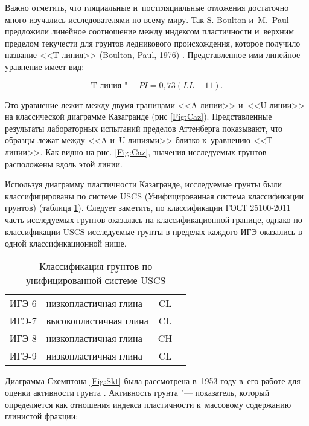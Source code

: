 Важно отметить, что гляциальные и~постгляциальные отложения достаточно много изучались исследователями по всему миру. Так S. Boulton и~M.~Paul  предложили линейное соотношение между  индексом пластичности и~верхним пределом текучести  для грунтов ледникового происхождения, которое получило название <<T-линия>> (Boulton, Paul, 1976) \cite{boulton1976}. Представленное ими линейное уравнение имеет вид:

\begin{equation}
    \label{eq:t}
    \text{T-линия "--- } PI = 0,73 (LL-11).
\end{equation}

Это уравнение лежит между двумя границами <<A-линии>> и~<<U-линии>> на классической диаграмме Казагранде (рис \ref{Fig:Caz}). Представленные результаты лабораторных испытаний пределов Аттенберга показывают, что образцы лежат между <<A и~U-линиями>> близко к~уравнению <<Т-линии>>. 
Как видно на рис. \ref{Fig:Caz}, значения исследуемых грунтов расположены вдоль этой линии. 

Используя диаграмму пластичности Казагранде, исследуемые грунты были классифицированы по системе USCS (Унифицированная система классификации грунтов) (таблица \ref{tab:uscs}). 
Следует заметить, по классификации ГОСТ 25100-2011 \cite{gost25100} часть исследуемых грунтов оказалась на классификационной границе, однако по классификации USCS исследуемые грунты в пределах каждого ИГЭ оказались в одной классификационной нише.

\begin{table}[ht]
    \centering
    \caption{Классификация грунтов по унифицированной системе USCS} \label{tab:uscs}
    \begin{tabular}{clcc}
    ИГЭ-6 \dotfill &  низкопластичная глина & CL \\
    ИГЭ-7 \dotfill &  высокопластичная глина  & CL \\
    ИГЭ-8 \dotfill &  низкопластичная глина & CH \\
    ИГЭ-9 \dotfill &  низкопластичная глина  & CL \\
    \end{tabular}
\end{table}

Диаграмма Скемптона \ref{Fig:Skt} была рассмотрена в~1953 году в~его работе для оценки активности грунта \cite{skempton1953}.
Активность грунта "--- показатель, который определяется как отношения индекса пластичности к~массовому содержанию глинистой фракции:

